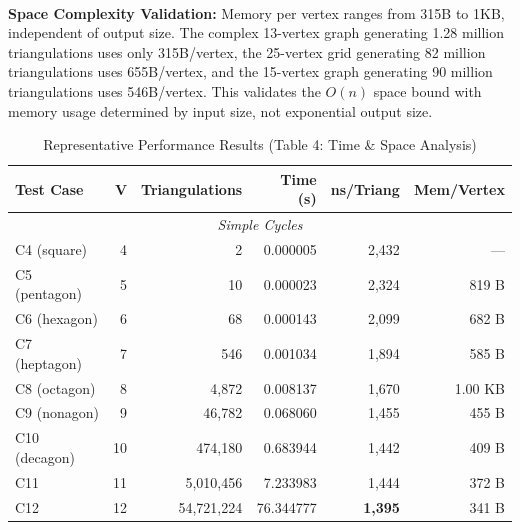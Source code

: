 ﻿﻿\documentclass[12pt,a4paper]{article}
\theoremstyle{definition}
\theoremstyle{remark}
\begin{document}
\textbf{Space Complexity Validation:} Memory per vertex ranges from 315B to 1KB, independent of output size. The complex 13-vertex graph generating 1.28 million triangulations uses only 315B/vertex, the 25-vertex grid generating 82 million triangulations uses 655B/vertex, and the 15-vertex graph generating 90 million triangulations uses 546B/vertex. This validates the $O(n)$ space bound with memory usage determined by input size, not exponential output size.

\begin{table}[htbp]
	\centering
	\footnotesize
	\caption{Representative Performance Results (Table 4: Time \& Space Analysis)}
	\label{tab:timing_results_part1}
	\begin{tabular}{|l|r|r|r|r|r|}
		\hline
		\textbf{Test Case} & \textbf{V} & \textbf{Triangulations} & \textbf{Time (s)} & \textbf{ns/Triang} & \textbf{Mem/Vertex} \\
		\hline
		\multicolumn{6}{|c|}{\textit{Simple Cycles}}                                                                             \\
		\hline
		C4 (square)        & 4          & 2                       & 0.000005          & 2,432              & ---                 \\
		C5 (pentagon)      & 5          & 10                      & 0.000023          & 2,324              & 819 B               \\
		C6 (hexagon)       & 6          & 68                      & 0.000143          & 2,099              & 682 B               \\
		C7 (heptagon)      & 7          & 546                     & 0.001034          & 1,894              & 585 B               \\
		C8 (octagon)       & 8          & 4,872                   & 0.008137          & 1,670              & 1.00 KB             \\
		C9 (nonagon)       & 9          & 46,782                  & 0.068060          & 1,455              & 455 B               \\
		C10 (decagon)      & 10         & 474,180                 & 0.683944          & 1,442              & 409 B               \\
		C11                & 11         & 5,010,456               & 7.233983          & 1,444              & 372 B               \\
		C12                & 12         & 54,721,224              & 76.344777         & \textbf{1,395}     & 341 B               \\

\end{tabular}
\end{table}
\end{document}
